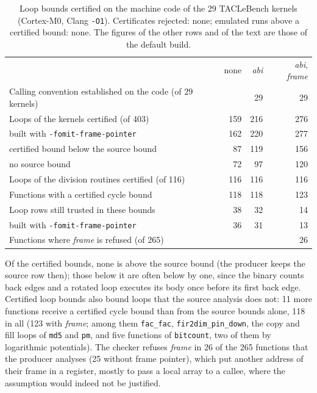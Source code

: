 \documentclass[oneside,english]{amsart}
\numberwithin{equation}{section}
\theoremstyle{plain}
\theoremstyle{definition}
\theoremstyle{plain}
\theoremstyle{plain}
\theoremstyle{remark}
\begin{document}
\begin{table}[ht]
\centering
\small
\begin{tabular}{@{}lrrr@{}}
\toprule
 & none & \emph{abi} & \emph{abi}, \emph{frame} \\
Calling convention established on the code (of 29 kernels) & & 29 & 29 \\
\midrule
Loops of the kernels certified (of 403) & 159 & 216 & 276 \\
\quad built with \texttt{-fomit-frame-pointer} & 162 & 220 & 277 \\
\quad certified bound below the source bound & 87 & 119 & 156 \\
\quad no source bound & 72 & 97 & 120 \\
Loops of the division routines certified (of 116) & 116 & 116 & 116 \\
Functions with a certified cycle bound & 118 & 118 & 123 \\
Loop rows still trusted in these bounds & 38 & 32 & 14 \\
\quad built with \texttt{-fomit-frame-pointer} & 36 & 31 & 13 \\
Functions where \emph{frame} is refused (of 265) & & & 26 \\
\bottomrule
\end{tabular}
\caption{Loop bounds certified on the machine code of the 29 TACLeBench kernels (Cortex-M0, Clang \texttt{-O1}). Certificates rejected: none; emulated runs above a certified bound: none. The figures of the other rows and of the text are those of the default build.}
\label{tab:loops}
\end{table}

Of the certified bounds, none is above the source bound (the producer keeps the source row then); those below it are often below by one, since the binary counts back edges and a rotated loop executes its body once before its first back edge. Certified loop bounds also bound loops that the source analysis does not: 11 more functions receive a certified cycle bound than from the source bounds alone, 118 in all (123 with \emph{frame}; among them \texttt{fac\_fac}, \texttt{fir2dim\_pin\_down}, the copy and fill loops of \texttt{md5} and \texttt{pm}, and five functions of \texttt{bitcount}, two of them by logarithmic potentials). The checker refuses \emph{frame} in 26 of the 265 functions that the producer analyses (25 without frame pointer), which put another address of their frame in a register, mostly to pass a local array to a callee, where the assumption would indeed not be justified.
\end{document}

